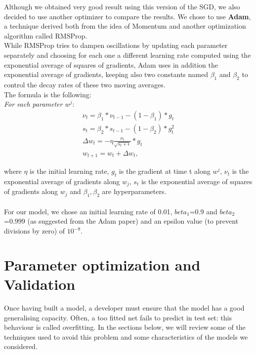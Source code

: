 \documentclass[12pt]{article}
\begin{document}
Although we obtained very good result using this version of the SGD, we also decided to use another optimizer to compare the results. We chose to use \textbf{Adam}, a technique derived both from the idea of Momentum and another optimization algorithm called RMSProp. \\
While RMSProp tries to dampen oscillations by updating each parameter separately and choosing for each one a different learning rate computed using the exponential average of squares of gradients, Adam uses in addition the exponential average of gradients, keeping also two constants named $\beta_{1}$ and $\beta_{2}$ to control the decay rates of these two moving averages. \\
The formula is the following: \\ 


\textit{For each parameter $w^{j}$}: 
\begin{align*}
\nu_{t}  = \beta_{1}  *  \nu_{t-1} - (1 - \beta_{1}) *g_{t} \\
s_{t} =  \beta_{2} * s_{t-1} - (1-\beta_{2}) * g_{t}^2\\
\Delta w_{t} = -\eta \frac{\nu_{t}}{\sqrt{s_{t} + \epsilon}}* g_{t}\\
w_{t+1} = w_{t} + \Delta w_{t},
\end{align*}

where $\eta$ is the initial learning rate, $g_{t}$ is the gradient at time t along $w^{j}$, $\nu_{t}$ is the exponential average of gradients along $w_{j}$, $s_{t}$ is the exponential average of squares of gradients along $w_{j}$ and $\beta_{1},\beta_{2}$ are hyperparameters. \\ \\
For our model, we chose an initial learning rate of 0.01, $beta_{1}$=0.9 and $beta_{2}$=0.999 (as suggested from the Adam paper) and an epsilon value (to prevent divisions by zero) of $10^{-8}$.

\newpage
\section{Parameter optimization and Validation}
Once having built a model, a developer must ensure that the model has a good generalising capacity. Often, a too fitted net fails to predict in test set: this behaviour is called overfitting.
In the sections below, we will review some of the techniques used to avoid this problem and some characteristics of the models we considered.
\end{document}
